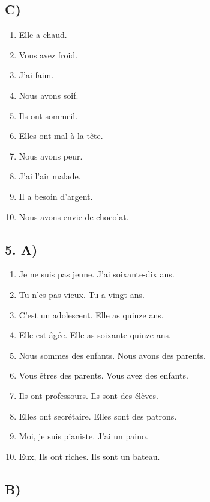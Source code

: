 \subsection*{C)}

\begin{enumerate}
    \item Elle a chaud.
    \item Vous avez froid.
    \item J'ai faim.
    \item Nous avons soif.
    \item Ils ont sommeil.
    \item Elles ont mal à la tête.
    \item Nous avons peur.
    \item J'ai l'air malade.
    \item Il a besoin d'argent.
    \item Nous avons envie de chocolat.
\end{enumerate}

\subsection*{5. A)}

\begin{enumerate}
    \item Je ne suis pas jeune. J'ai soixante-dix ans.
    \item Tu n'es pas vieux. Tu a vingt ans.
    \item C'est un adolescent. Elle as quinze ans.
    \item Elle est âgée. Elle as soixante-quinze ans.
    \item Nous sommes des enfants. Nous avons des parents.
    \item Vous êtres des parents. Vous avez des enfants.
    \item Ils ont professours. Ils sont des élèves.
    \item Elles ont secrétaire. Elles sont des patrons.
    \item Moi, je suis pianiste. J'ai un paino.
    \item Eux, Ils ont riches. Ils sont un bateau.  
\end{enumerate}

\subsection*{B)}

